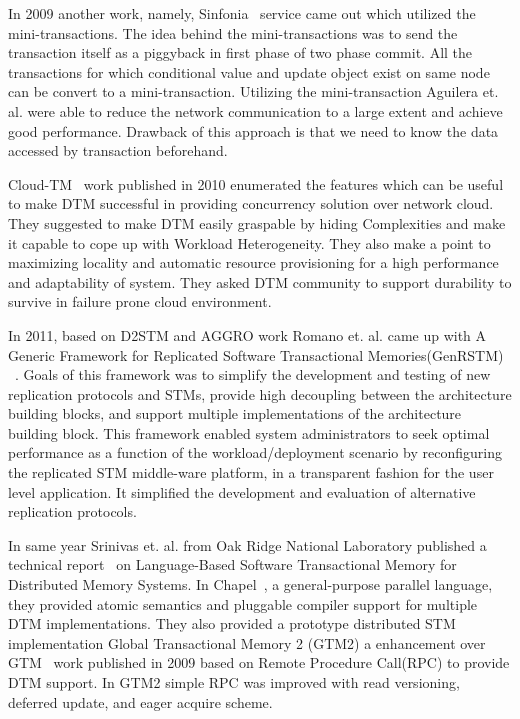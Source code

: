 \documentclass[12pt,english]{report}
\begin{document}
In 2009 another work, namely, Sinfonia~\cite{Aguilera:2009:SNP:1629087.1629088} service came out which utilized the mini-transactions. The idea behind the mini-transactions was to send the transaction itself as a piggyback in first phase of two phase commit. All the transactions for which conditional value and update object exist on same node can be convert to a mini-transaction. Utilizing the mini-transaction Aguilera et. al. were able to reduce the network communication to a large extent and achieve good performance. Drawback of this approach is that we need to know the data accessed by transaction beforehand.

Cloud-TM~\cite{Romano:2010:CHC:1773912.1773914} work published in 2010 enumerated the features which can be useful to make DTM successful in providing concurrency solution over network cloud. They suggested to make DTM easily graspable by hiding Complexities and make it capable to cope up with Workload Heterogeneity. They also make a point to maximizing locality and automatic resource provisioning for a high performance and adaptability of system. They asked DTM community to support durability to survive in failure prone cloud environment. 

In 2011, based on D2STM and AGGRO work Romano et. al. came up with A Generic Framework for Replicated Software Transactional Memories(GenRSTM) ~\cite{GenRSTM:6038614}. Goals of this framework was to simplify the development and testing of new replication protocols and STMs, provide high decoupling between the architecture building blocks, and support multiple implementations of the architecture building block. This framework enabled system administrators to seek optimal performance as a function of the workload/deployment scenario by reconfiguring the replicated STM middle-ware platform, in a transparent fashion for the
user level application. It simplified the development and evaluation of alternative replication protocols.

In same year Srinivas et. al. from Oak Ridge National Laboratory published a technical report~\cite{sridharan2011scalable} on Language-Based Software Transactional Memory for Distributed Memory Systems. In Chapel~\cite{chapel:Language}, a general-purpose parallel language, they provided atomic semantics and pluggable compiler support for multiple DTM implementations. They also provided a prototype distributed STM implementation Global Transactional Memory 2 (GTM2) a enhancement over GTM~\cite{sridharan2009scalable} work published in 2009 based on Remote Procedure Call(RPC) to provide DTM  support. In GTM2 simple RPC was improved with read versioning, deferred update, and eager acquire scheme.
\end{document}
